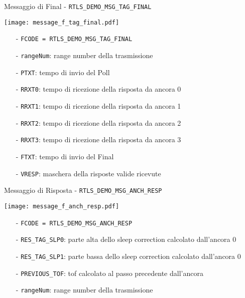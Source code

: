 \begin{frame}{Messaggio di Final - \lstinline!RTLS_DEMO_MSG_TAG_FINAL!}
  \begin{center}
    \texttt{[image: message\_f\_tag\_final.pdf]}
  \end{center}
  \begin{itemize}
  \item[-] \lstinline!FCODE = RTLS_DEMO_MSG_TAG_FINAL!
  \item[-] \lstinline!rangeNum!: range number della trasmissione
  \item[-] \lstinline!PTXT!: tempo di invio del Poll
  \item[-] \lstinline!RRXT0!: tempo di ricezione della risposta da ancora 0
  \item[-] \lstinline!RRXT1!: tempo di ricezione della risposta da ancora 1
  \item[-] \lstinline!RRXT2!: tempo di ricezione della risposta da ancora 2
  \item[-] \lstinline!RRXT3!: tempo di ricezione della risposta da ancora 3
  \item[-] \lstinline!FTXT!: tempo di invio del Final
  \item[-] \lstinline!VRESP!: maschera della risposte valide ricevute
  \end{itemize}
\end{frame}

\begin{frame}{Messaggio di Risposta - \lstinline!RTLS_DEMO_MSG_ANCH_RESP!}
  \begin{center}
    \texttt{[image: message\_f\_anch\_resp.pdf]}
  \end{center}
  \begin{itemize}
  \item[-] \lstinline!FCODE = RTLS_DEMO_MSG_ANCH_RESP!
  \item[-] \lstinline!RES_TAG_SLP0!: parte alta dello sleep correction calcolato dall'ancora 0
  \item[-] \lstinline!RES_TAG_SLP1!: parte bassa dello sleep correction calcolato dall'ancora 0
  \item[-] \lstinline!PREVIOUS_TOF!: tof calcolato al passo precedente dall'ancora
  \item[-] \lstinline!rangeNum!: range number della trasmissione
  \end{itemize}
\end{frame}

